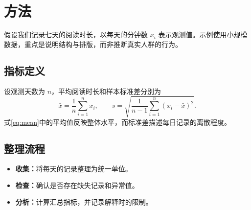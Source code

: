 \section{方法}\label{sec:method}
假设我们记录七天的阅读时长，以每天的分钟数 $x_i$ 表示观测值。示例使用小规模数据，重点是说明结构与排版，而非推断真实人群的行为。
\subsection{指标定义}
设观测天数为 $n$，平均阅读时长和样本标准差分别为
\begin{equation}\label{eq:mean}
\bar{x}=\frac{1}{n}\sum_{i=1}^{n}x_i,\qquad s=\sqrt{\frac{1}{n-1}\sum_{i=1}^{n}(x_i-\bar{x})^2}.
\end{equation}
式\eqref{eq:mean}中的平均值反映整体水平，而标准差描述每日记录的离散程度。
\subsection{整理流程}
\begin{itemize}
\item \textbf{收集：}将每天的记录整理为统一单位。
\item \textbf{检查：}确认是否存在缺失记录和异常值。
\item \textbf{分析：}计算汇总指标，并记录解释时的限制。
\end{itemize}
